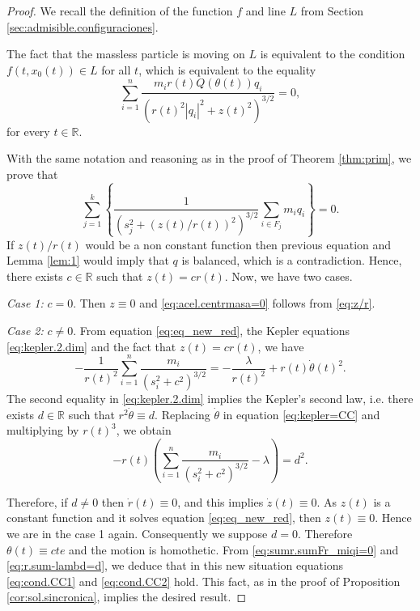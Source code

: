 \documentclass[smallcondensed]{svjour3}
\newcommand{\rr}{\mathbb{R}}
\begin{document}
\begin{proof}
 We recall the definition of the function $f$ and line $L$ from  Section \ref{sec:admisible.configuraciones}.

The fact that the massless particle is moving on $L$ is equivalent to the condition $f(t,x_0(t))\in L$ for all $t$, 
which is equivalent to the equality
\begin{equation}\label{eq:z/r}
 \sum_{i=1}^n\frac{m_ir(t)Q(\theta (t))q_i}{\left(r(t)^2|q_i|^2+z(t)^2\right)^{3/2}}=0,
\end{equation}
for every $t\in \rr$.

With the same notation and reasoning as in the proof of Theorem \ref{thm:prim}, we prove that
\begin{equation}\label{eq:sumr.sumFr_miqi=0}
\sum_{j=1}^k\left\{\frac{1}{(s_j^{2}+(z(t)/r(t))^2)^{3/2}}\sum_{i\in F_j}m_iq_i\right\}=0.
\end{equation}
If $z(t)/r(t)$  would be a non constant function then previous equation and Lemma \ref{lem:1} would imply that $q$ is balanced, which is a contradiction. Hence, there exists $c\in \rr$ such that $z(t)=cr(t)$. Now, we have two cases.

\emph{Case 1:} $c=0$. Then $z\equiv 0$ and \eqref{eq:acel.centrmasa=0} follows from \eqref{eq:z/r}.

\emph{Case 2:} $c\neq 0$. From equation \eqref{eq:eq_new_red}, the Kepler equations \eqref{eq:kepler.2.dim} and the fact that $z(t)=cr(t)$, we have 
\begin{equation}\label{eq:kepler=CC}
 -\frac{1}{r(t)^2}\sum_{i=1}^{n}\frac{m_i}{(s_i^2+c^2)^{3/2}}=-\frac{\lambda}{r(t)^2}+r(t)\dot{\theta}(t)^2.
\end{equation}
The second equality in \eqref{eq:kepler.2.dim} implies the Kepler's second law, i.e. there exists $d\in\rr$ such that $r^2\dot{\theta}\equiv d$. Replacing $\dot{\theta}$ in equation \eqref{eq:kepler=CC} and multiplying by $r(t)^3$, we obtain
\begin{equation}\label{eq:r.sum-lambd=d}
-r(t)\left(\sum_{i=1}^{n}\frac{m_i}{(s_i^2+c^2)^{3/2}}-\lambda\right)=d^2.
\end{equation}

Therefore, if $d\neq 0$ then $\dot{r}(t)\equiv 0$, and this implies $\dot{z}(t)\equiv 0$. As $z(t)$ is a constant function and it solves equation \eqref{eq:eq_new_red}, then $z(t)\equiv 0$. Hence we are in the case 1 again. Consequently we suppose $d=0$. Therefore $\theta(t)\equiv cte$ and the motion is homothetic. From \eqref{eq:sumr.sumFr_miqi=0} and \eqref{eq:r.sum-lambd=d}, we deduce that in this new situation equations \eqref{eq:cond.CC1} and \eqref{eq:cond.CC2} hold. This fact, as in the proof of Proposition \ref{cor:sol.sincronica}, implies the desired result.

\end{proof}
\end{document}
